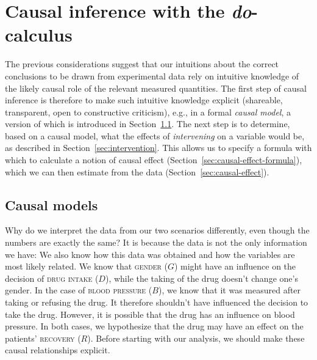 \documentclass[nobib]{tufte-handout}
\newcommand{\docalc}{\emph{do}-calculus\xspace}
\begin{document}
\section{Causal inference with the \docalc} \label{sec:theory}

The previous considerations suggest that our intuitions about the correct conclusions to be drawn from experimental data rely on intuitive knowledge of the likely causal role of the relevant measured quantities.
The first step of causal inference is therefore to make such intuitive knowledge explicit (shareable, transparent, open to constructive criticism), e.g., in a formal \textit{causal model}, a version of which is introduced in Section~\ref{sec:causal-models}.
The next step is to determine, based on a causal model, what the effects of \textit{intervening} on a variable would be, as described in Section~\ref{sec:intervention}.
This allows us to specify a formula with which to calculate a notion of causal effect (Section~\ref{sec:causal-effect-formula}), which we can then estimate from the data (Section~\ref{sec:causal-effect}).



\subsection{Causal models} \label{sec:causal-models}

Why do we interpret the data from our two scenarios differently, even though the numbers are exactly the same?
It is because the data is not the only information we have: We also know how this data was obtained and how the variables are most likely related. 
We know that \textsc{gender} ($G$) might have an influence on the decision of \textsc{drug intake} ($D$), while the taking of the drug doesn't change one's gender.
In the case of \textsc{blood pressure} ($B$), we know that it was measured after taking or refusing the drug.
It therefore shouldn't have influenced the decision to take the drug.
However, it is possible that the drug has an influence on blood pressure.
In both cases, we hypothesize that the drug may have an effect on the patients' \textsc{recovery} ($R$).
Before starting with our analysis, we should make these causal relationships explicit.
\end{document}
